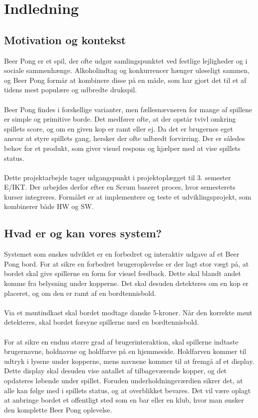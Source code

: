 \documentclass[Rapport/Rapport_main.tex]{subfiles}
\begin{document}
\section{Indledning}\label{sec:Indledning}
\subsection{Motivation og kontekst}
Beer Pong er et spil, der ofte udgør samlingspunktet ved festlige lejligheder og i sociale sammenhænge. Alkoholindtag og konkurrencer hænger uløseligt sammen, og Beer Pong formår at kombinere disse på en måde, som har gjort det til et af tidens mest populære og udbredte drukspil.\cite{drinking_research}\\\\
Beer Pong findes i forskellige varianter, men fællesnævneren for mange af spillene er simple og primitive borde. Det medfører ofte, at der opstår tvivl omkring spillets score, og om en given kop er ramt eller ej. Da det er brugernes eget ansvar at styre spillets gang, hersker der ofte udbredt forvirring. Der er således behov for et produkt, som giver visuel respons og hjælper med at vise spillets status.
\\\\Dette projektarbejde tager udgangspunkt i projektoplægget til 3. semester E/IKT\cite{Universitet2018}. Der arbejdes derfor efter en Scrum baseret proces, hvor semesterets kurser integreres. Formålet er at implementere og teste et udviklingsprojekt, som kombinerer både HW og SW.

\subsection{Hvad er og kan vores system?}
Systemet som ønskes udviklet er en forbedret og interaktiv udgave af et Beer Pong bord. For at sikre en forbedret brugeroplevelse er der lagt stor vægt på, at bordet skal give spillerne en form for visuel feedback. Dette skal blandt andet komme fra belysning under kopperne. Det skal desuden detekteres om en kop er placeret, og om den er ramt af en bordtennisbold.\\\\Via et møntindkast skal bordet modtage danske 5-kroner. Når den korrekte mønt detekteres, skal bordet forsyne spillerne med en bordtennisbold.\\\\For at sikre en endnu større grad af brugerinteraktion, skal spillerne indtaste brugernavne, holdnavne og holdfarve på en hjemmeside. Holdfarven kommer til udtryk i lysene under kopperne, mens navnene kommer til at fremgå af et display. Dette display skal desuden vise antallet af tilbageværende kopper, og det opdateres løbende under spillet. Foruden underholdningsværdien sikrer det, at alle kan følge med i spillets status, og at overblikket bevares. Det vil være oplagt at anbringe bordet et offentligt sted som en bar eller en klub, hvor man ønsker den komplette Beer Pong oplevelse.
\end{document}
